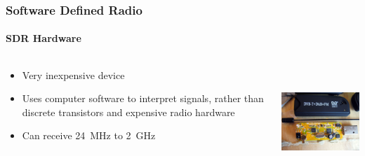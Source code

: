 \documentclass[aspectratio=169]{beamer}
\begin{document}
\begin{frame}
    \frametitle{Software Defined Radio}
    \framesubtitle{SDR Hardware}
    \begin{columns}[T]
        \begin{column}[T]{6cm}
            \begin{itemize}
                \item{Very inexpensive device}
                \item{Uses computer software to interpret signals, rather than discrete transistors and expensive radio hardware}
                \item{Can receive 24~MHz to 2~GHz}
            \end{itemize}
        \end{column}
        \begin{column}[T]{5cm}
            \includegraphics[height=4cm]{images/rtlsdr.jpg}
        \end{column}
    \end{columns}
\end{frame}
\end{document}
